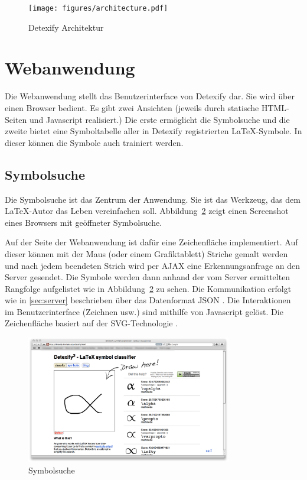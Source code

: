 \begin{figure}[htbp]
  \centering \texttt{[image: figures/architecture.pdf]}
  \caption{Detexify Architektur}
  \label{fig:architecture}
\end{figure}

\section{Webanwendung} %
\label{sec:webanwendung}


Die Webanwendung stellt das Benutzerinterface von Detexify dar. Sie wird über einen Browser bedient. Es gibt zwei Ansichten (jeweils durch statische \ac{HTML}-Seiten und Javascript realisiert.) Die erste ermöglicht die Symbolsuche und die zweite bietet eine Symboltabelle aller in Detexify registrierten \LaTeX-Symbole. In dieser können die Symbole auch trainiert werden.

\subsection{Symbolsuche} %
\label{sub:symbolsuche}

Die Symbolsuche ist das Zentrum der Anwendung. Sie ist das Werkzeug, das dem \LaTeX-Autor das Leben vereinfachen soll. Abbildung~\ref{fig:symbolsuche} zeigt einen Screenshot eines Browsers mit geöffneter Symbolsuche.

Auf der Seite der Webanwendung ist dafür eine Zeichenfläche implementiert. Auf dieser können mit der Maus (oder einem Grafiktablett) Striche gemalt werden und nach jedem beendeten Strich wird per AJAX \cite{AJAX} eine Erkennungsanfrage an den Server gesendet. Die Symbole werden dann anhand der vom Server ermittelten Rangfolge aufgelistet wie in Abbildung~\ref{fig:symbolsuche} zu sehen. Die Kommunikation erfolgt wie in \ref{sec:server} beschrieben über das Datenformat \ac{JSON} \cite{json}. Die Interaktionen im Benutzerinterface (Zeichnen usw.) sind mithilfe von Javascript gelöst. Die Zeichenfläche basiert auf der \ac{SVG}-Technologie \cite{svg}.

\begin{figure}[htbp]
  \centering \includegraphics[width=0.8\textwidth]{figures/interface-classify.png}
  \caption{Symbolsuche}
  \label{fig:symbolsuche}
\end{figure}


